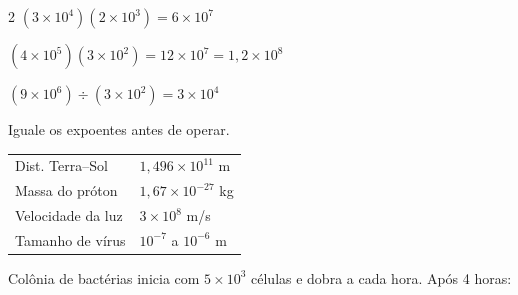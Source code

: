 \documentclass[12pt]{article}
\begin{document}
\begin{multicols}{2}
$(3 \times 10^4)(2 \times 10^3) = 6 \times 10^7$

$(4 \times 10^5)(3 \times 10^2) = 12 \times 10^7 = \boxed{1{,}2 \times 10^8}$

$(9 \times 10^6) \div (3 \times 10^2) = 3 \times 10^4$


Iguale os expoentes antes de operar.




\begin{tabular}{ll}
Dist. Terra–Sol & $1{,}496 \times 10^{11}$ m \\
Massa do próton & $1{,}67 \times 10^{-27}$ kg \\
Velocidade da luz & $3 \times 10^8$ m/s \\
Tamanho de vírus & $10^{-7}$ a $10^{-6}$ m \\
\end{tabular}


Colônia de bactérias inicia com $5 \times 10^3$ células e dobra a cada hora. Após 4 horas:



\end{multicols}

\end{document}
